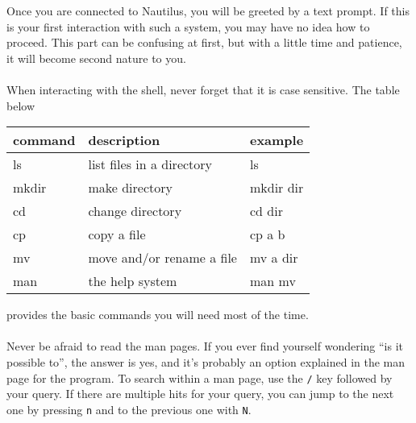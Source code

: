 Once you are connected to Nautilus, you will be greeted by a text prompt.  If this is your first interaction with such a system, you may have no idea how to proceed.  This part can be confusing at first, but with a little time and patience, it will become second nature to you.\\\\
%
When interacting with the shell, never forget that it is case sensitive.  The table below
\begin{table}[h]
 \centering
  \begin{tabular}{lll}\hline
   command & description & example\\\hline
   ls & list files in a directory & ls\\
   mkdir & make directory & mkdir dir\\
   cd & change directory & cd dir\\
   cp & copy a file & cp a b\\
   mv & move and/or rename a file & mv a dir\\
   man & the help system & man mv\\\hline       
  \end{tabular}
\end{table}  
provides the basic commands you will need most of the time.\\\\
%
Never be afraid to read the man pages.  If you ever find yourself wondering ``is it possible to'', the answer is yes, and it's probably an option explained in the man page for the program.  To search within a man page, use the \texttt{/} key followed by your query.  If there are multiple hits for your query, you can jump to the next one by pressing \texttt{n} and to the previous one with \texttt{N}.


